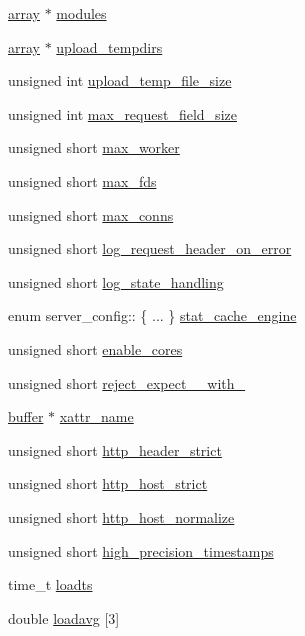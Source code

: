\begin{DoxyCompactItemize}
\hyperlink{structarray}{array} $\ast$ \hyperlink{structserver__config_a950cd04ccccaeabb293df867d6c84c32}{modules}
\item 
\hyperlink{structarray}{array} $\ast$ \hyperlink{structserver__config_a7c21ba7671f79f335b982afc3a1b6750}{upload\-\_\-tempdirs}
\item 
unsigned int \hyperlink{structserver__config_afe8228f04feb3dc43c74509237dea66c}{upload\-\_\-temp\-\_\-file\-\_\-size}
\item 
unsigned int \hyperlink{structserver__config_aac02592a904eec5fd5363a5da7037713}{max\-\_\-request\-\_\-field\-\_\-size}
\item 
unsigned short \hyperlink{structserver__config_a7df2e6601a6df2dd8c6972add0a63e3f}{max\-\_\-worker}
\item 
unsigned short \hyperlink{structserver__config_ae65013d5141af52b410821b845236a31}{max\-\_\-fds}
\item 
unsigned short \hyperlink{structserver__config_a124053000ad46a1b4b5a81fbfcf07a3a}{max\-\_\-conns}
\item 
unsigned short \hyperlink{structserver__config_afcdd28bd473ac841d89ebee1162033c8}{log\-\_\-request\-\_\-header\-\_\-on\-\_\-error}
\item 
unsigned short \hyperlink{structserver__config_ab028ad3b381dd25f502164e52e1ae206}{log\-\_\-state\-\_\-handling}
\item 
enum server\-\_\-config\-:: \{ ... \}  \hyperlink{structserver__config_a0aae802ab9165ae27bc9ad1a4f9fb11e}{stat\-\_\-cache\-\_\-engine}
\item 
unsigned short \hyperlink{structserver__config_a7aea773133ad2644b719803a831b462e}{enable\-\_\-cores}
\item 
unsigned short \hyperlink{structserver__config_a3b30a0c8d1ae1fc6838e0f242f28798e}{reject\-\_\-expect\-\_\-\_\-with\-\_}
\item 
\hyperlink{structbuffer}{buffer} $\ast$ \hyperlink{structserver__config_a4e4ddccc2ac172d7ee15d6d1556c4d65}{xattr\-\_\-name}
\item 
unsigned short \hyperlink{structserver__config_aec43b7fbf466178f95d5e119a6f2ea25}{http\-\_\-header\-\_\-strict}
\item 
unsigned short \hyperlink{structserver__config_a34848b2951593edb4ef89616f3ae49c2}{http\-\_\-host\-\_\-strict}
\item 
unsigned short \hyperlink{structserver__config_a3a4d7c20e77274eb8e27aa41f6a1d3b8}{http\-\_\-host\-\_\-normalize}
\item 
unsigned short \hyperlink{structserver__config_a78de0d577be8fcfd551e7b3045790245}{high\-\_\-precision\-\_\-timestamps}
\item 
time\-\_\-t \hyperlink{structserver__config_a2209aca71a689ddbb02883b9cc955a87}{loadts}
\item 
double \hyperlink{structserver__config_ac086f0477e0bb6a75b54e95cde83189e}{loadavg} \mbox{[}3\mbox{]}
\end{DoxyCompactItemize}


